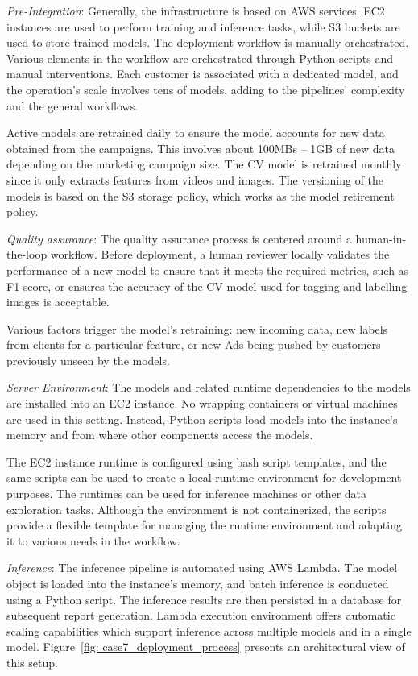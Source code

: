\textit{Pre-Integration}: Generally, the infrastructure is based on AWS services. EC2 instances are used to perform training and inference tasks, while S3 buckets are used to store trained models. The deployment workflow is manually orchestrated. Various elements in the workflow are orchestrated through Python scripts and manual interventions. Each customer is associated with a dedicated model, and the operation's scale involves tens of models, adding to the pipelines' complexity and the general workflows.

Active models are retrained daily to ensure the model accounts for new data obtained from the campaigns. This involves about 100MBs – 1GB of new data depending on the marketing campaign size. The CV model is retrained monthly since it only extracts features from videos and images. The versioning of the models is based on the S3 storage policy, which works as the model retirement policy.

\textit{Quality assurance}: The quality assurance process is centered around a human-in-the-loop workflow. Before deployment, a human reviewer locally validates the performance of a new model to ensure that it meets the required metrics, such as F1-score, or ensures the accuracy of the CV model used for tagging and labelling images is acceptable.

Various factors trigger the model's retraining: new incoming data, new labels from clients for a particular feature, or new Ads being pushed by customers previously unseen by the models.

\textit{Server Environment}: The models and related runtime dependencies to the models are installed into an EC2 instance. No wrapping containers or virtual machines are used in this setting. Instead, Python scripts load models into the instance's memory and from where other components access the models.

The EC2 instance runtime is configured using bash script templates, and the same scripts can be used to create a local runtime environment for development purposes. The runtimes can be used for inference machines or other data exploration tasks. Although the environment is not containerized, the scripts provide a flexible template for managing the runtime environment and adapting it to various needs in the workflow.

\textit{Inference}: The inference pipeline is automated using AWS Lambda. The model object is loaded into the instance's memory, and batch inference is conducted using a Python script. The inference results are then persisted in a database for subsequent report generation. Lambda execution environment offers automatic scaling capabilities which support inference across multiple models and in a single model. Figure~\ref{fig: case7_deployment_process} presents an architectural view of this setup.

